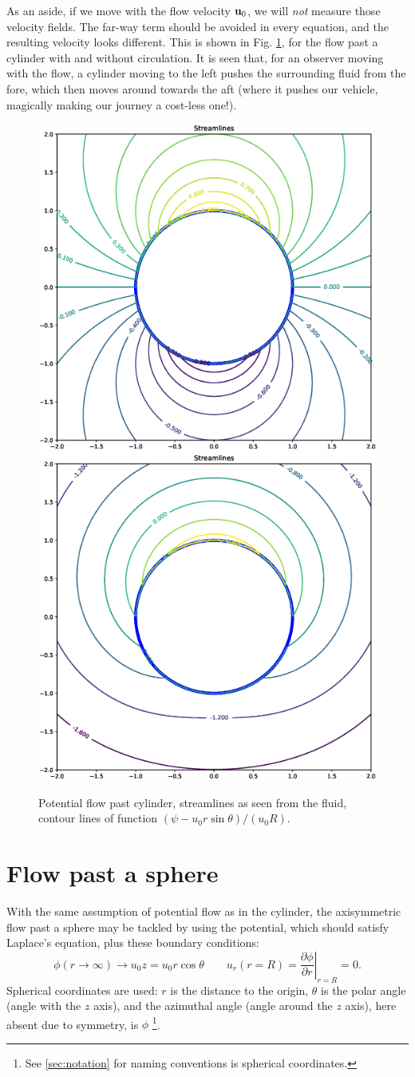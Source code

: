 As an aside, if we move with the flow velocity $\mathbf{u}_0$,
we will \emph{not} measure those velocity fields. The far-way term
should be avoided in every equation, and the resulting velocity looks different.
This is shown in Fig. \ref{fig:potential_flow_past_cylinder_moving}, for the
flow past a cylinder with and without circulation. It is seen that,
for an observer moving with the flow, a cylinder moving to the left
pushes the surrounding fluid from the fore, which then moves around towards the aft
(where it pushes our vehicle, magically making our journey a cost-less one!).

\begin{figure}
  \centering
  \includegraphics[width=0.4\linewidth]{figures/potential_flow_past_cylinder_moving}
  \includegraphics[width=0.4\linewidth]{figures/potential_flow_past_cylinder_rotating_moving}
  \caption{%
  		Potential flow past cylinder, streamlines as seen from the
  		fluid,  contour lines of function $ ( \psi - u_0 r\sin\theta )  / (u_0 R)$.
  	\label{fig:potential_flow_past_cylinder_moving}}
\end{figure}


\section{Flow past a sphere}

With the same assumption of potential flow as in the cylinder, the
axisymmetric flow past a sphere may be tackled by using the potential,
which should satisfy Laplace's equation, plus these boundary
conditions:
\[
  \phi (r\to \infty) \to u_0 z = u_0 r \cos\theta \qquad
  u_r(r=R) =\left. \frac{\partial \phi}{\partial r} \right|_{r=R} = 0 .
\]
Spherical coordinates  are used:
$r$ is the distance to the origin, $\theta$ is the polar angle (angle
with the $z$ axis), and the azimuthal angle (angle around the $z$
axis), here absent due to symmetry, is $\phi$ %
\footnote{See \ref{sec:notation} for naming conventions is spherical
coordinates.}.


